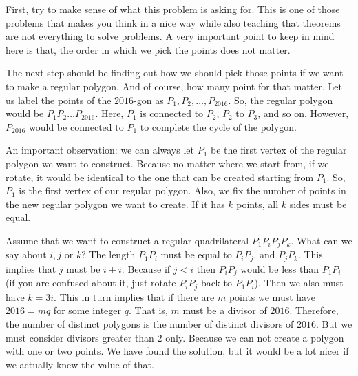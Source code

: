 \documentclass[12pt]{subfile}
\begin{document}
			\begin{solution}
				First, try to make sense of what this problem is asking for. This is one of those problems that makes you think in a nice way while also teaching that theorems are not everything to solve problems. A very important point to keep in mind here is that, the order in which we pick the points does not matter.
				
				The next step should be finding out how we should pick those points if we want to make a regular polygon. And of course, how many point for that matter. Let us label the points of the $2016$-gon as $P_1,P_2,\ldots,P_{2016}$. So, the regular polygon would be $P_1P_2\ldots P_{2016}$. Here, $P_1$ is connected to $P_2$, $P_2$ to $P_3$, and so on. However, $P_{2016}$ would be connected to $P_1$ to complete the cycle of the polygon.
				
				An important observation: we can always let $P_1$ be the first vertex of the regular polygon we want to construct. Because no matter where we start from, if we rotate, it would be identical to the one that can be created starting from $P_1$. So, $P_1$ is the first vertex of our regular polygon. Also, we fix the number of points in the new regular polygon we want to create. If it has $k$ points, all $k$ sides must be equal.
				
				Assume that we want to construct a regular quadrilateral $P_1P_iP_jP_k$. What can we say about $i, j$ or $k$? The length $P_1P_i$ must be equal to $P_iP_j$, and $P_jP_k$. This implies that $j$ must be $i+i$. Because if $j<i$ then $P_iP_j$ would be less than $P_1P_i$ (if you are confused about it, just rotate $P_iP_j$ back to $P_1P_i$). Then we also must have $k=3i$. This in turn implies that if there are $m$ points we must have $2016=mq$ for some integer $q$. That is, $m$ must be a divisor of $2016$. Therefore, the number of distinct polygons is the number of distinct divisors of $2016$. But we must consider divisors greater than $2$ only. Because we can not create a polygon with one or two points. We have found the solution, but it would be a lot nicer if we actually knew the value of that.
			\end{solution}
\end{document}
